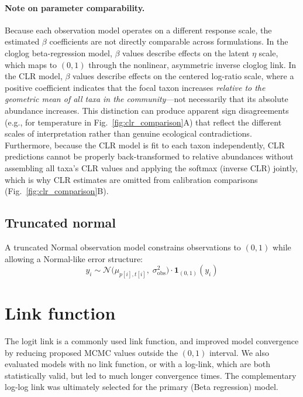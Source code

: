 \documentclass[11pt]{article}
\begin{document}
\paragraph{Note on parameter comparability.}
Because each observation model operates on a different response scale, the estimated $\beta$ coefficients are not directly comparable across formulations. In the cloglog beta-regression model, $\beta$ values describe effects on the latent $\eta$ scale, which maps to $(0,1)$ through the nonlinear, asymmetric inverse cloglog link. In the CLR model, $\beta$ values describe effects on the centered log-ratio scale, where a positive coefficient indicates that the focal taxon increases \emph{relative to the geometric mean of all taxa in the community}---not necessarily that its absolute abundance increases. This distinction can produce apparent sign disagreements (e.g., for temperature in Fig.~\ref{fig:clr_comparison}A) that reflect the different scales of interpretation rather than genuine ecological contradictions. Furthermore, because the CLR model is fit to each taxon independently, CLR predictions cannot be properly back-transformed to relative abundances without assembling all taxa's CLR values and applying the softmax (inverse CLR) jointly, which is why CLR estimates are omitted from calibration comparisons (Fig.~\ref{fig:clr_comparison}B).

\subsection{Truncated normal}

A truncated Normal observation model constrains observations to $(0,1)$ while allowing a Normal-like error structure:
\begin{equation}
y_i \sim \mathcal{N}\!\bigl(\mu_{p[i],t[i]},\; \sigma_{\mathrm{obs}}^2\bigr) \cdot \mathbf{1}_{(0,1)}(y_i)
\end{equation}


\section{Link function}

The logit link is a commonly used link function, and improved model convergence by reducing proposed MCMC values outside the $(0,1)$ interval. We also evaluated models with no link function, or with a log-link, which are both statistically valid, but led to much longer convergence times. The complementary log-log link was ultimately selected for the primary (Beta regression) model.
\end{document}
